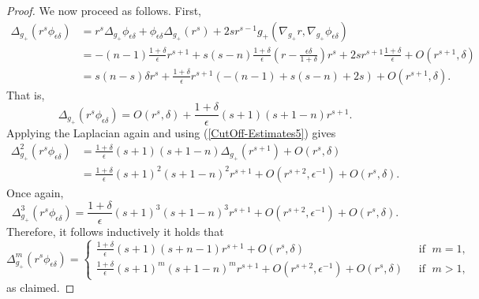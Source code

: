\documentclass{amsart}
\newcommand{\D}{\delta}
\newcommand{\E}{\epsilon}
\begin{document}
\begin{proof}
    We now proceed as follows. First, 
    \[
    \begin{split}
        \Delta_{g_+}(r^s\phi_{\E\D}) &= r^{s}\Delta_{g_+}\phi_{\E\D} + \phi_{\E\D}\Delta_{g_+}(r^s) + 2sr^{s-1}g_+(\nabla_{g_+}r, \nabla_{g_+}\phi_{\E\D}) \\ &= -(n-1)\frac{1+\D}{\E}r^{s+1} + s(s-n)\frac{1+\delta}{\epsilon}\left(r-\frac{\epsilon\delta}{1+\delta}\right)r^s + 2sr^{s+1}\frac{1+\D}{\E} + O(r^{s+1},\D) \\&= s(n-s)\D r^s + \frac{1+\D}{\E}r^{s+1}(-(n-1)+s(s-n)+2s) + O(r^{s+1}, \D).
    \end{split}
    \]
    That is,
    \begin{equation}
        \Delta_{g_+}(r^s\phi_{\E\D}) = O(r^s,\D) + \frac{1+\D}{\E}(s+1)(s+1-n)r^{s+1}.
    \end{equation}
    Applying the Laplacian again and using (\ref{CutOff-Estimates5}) gives
    \[
    \begin{split}
        \Delta_{g_+}^2(r^s\phi_{\E\D}) &= \frac{1+\D}{\E}(s+1)(s+1-n)\Delta_{g_+}(r^{s+1}) + O(r^s,\D) \\& = \frac{1+\D}{\E}(s+1)^2(s+1-n)^2r^{s+1}+ O(r^{s+2},\E^{-1}) + O(r^s,\D).
    \end{split}
    \]
    Once again,
    \[
    \Delta^3_{g_+}(r^s\phi_{\E\D}) = \frac{1+\D}{\E}(s+1)^3(s+1-n)^3r^{s+1} + O(r^{s+2},\E^{-1}) + O(r^s,\D).
    \]
    Therefore, it follows inductively it holds that
    \[
    \Delta^m_{g_+}(r^s\phi_{\E\D}) = 
    \begin{cases}
    \frac{1+\D}{\E}(s+1)(s+n-1)r^{s+1} +O(r^s,\D) & \;\text{ if }\;m=1,\\
    \frac{1+\D}{\E}(s+1)^m(s+1-n)^mr^{s+1} + O(r^{s+2},\E^{-1}) + O(r^s,\D) &\;\text{ if }\;m>1,
    \end{cases} 
    \]
    as claimed.


\end{proof}
\end{document}
